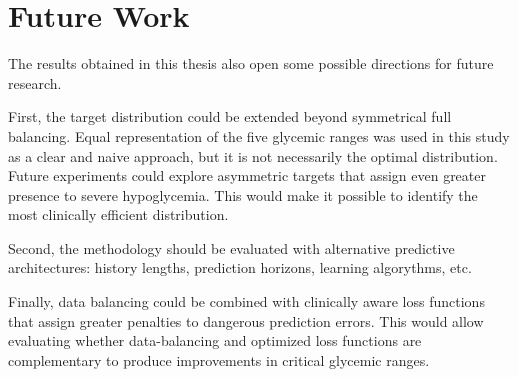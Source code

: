 \section{Future Work}
\label{sec:future_work}

The results obtained in this thesis also open some possible directions for future research.

First, the target distribution could be extended beyond symmetrical full balancing. Equal representation of the five glycemic ranges was used in this study as a clear and naive approach, but it is not necessarily the optimal distribution. Future experiments could explore asymmetric targets that assign even greater presence to severe hypoglycemia. This would make it possible to identify the most clinically efficient distribution.

Second, the methodology should be evaluated with alternative predictive architectures: history lengths, prediction horizons, learning algorythms, etc.

Finally, data balancing could be combined with clinically aware loss functions that assign greater penalties to dangerous prediction errors. This would allow evaluating whether data-balancing and optimized loss functions are complementary to produce improvements in critical glycemic ranges.